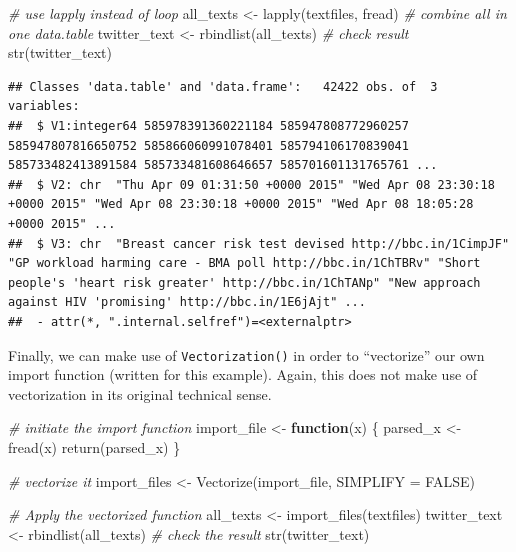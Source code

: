 \documentclass[
  12pt,
]{style/krantz}
\newenvironment{Shaded}{\begin{snugshade}}{\end{snugshade}}
\newcommand{\AttributeTok}[1]{\textcolor[rgb]{0.77,0.63,0.00}{#1}}
\newcommand{\CommentTok}[1]{\textcolor[rgb]{0.56,0.35,0.01}{\textit{#1}}}
\newcommand{\ConstantTok}[1]{\textcolor[rgb]{0.00,0.00,0.00}{#1}}
\newcommand{\ControlFlowTok}[1]{\textcolor[rgb]{0.13,0.29,0.53}{\textbf{#1}}}
\newcommand{\FunctionTok}[1]{\textcolor[rgb]{0.00,0.00,0.00}{#1}}
\newcommand{\NormalTok}[1]{#1}
\newcommand{\OtherTok}[1]{\textcolor[rgb]{0.56,0.35,0.01}{#1}}
\begin{document}
\begin{Shaded}
\begin{Highlighting}[]
\CommentTok{\# use lapply instead of loop}
\NormalTok{all\_texts }\OtherTok{\textless{}{-}} \FunctionTok{lapply}\NormalTok{(textfiles, fread)}
\CommentTok{\# combine all in one data.table}
\NormalTok{twitter\_text }\OtherTok{\textless{}{-}} \FunctionTok{rbindlist}\NormalTok{(all\_texts)}
\CommentTok{\# check result}
\FunctionTok{str}\NormalTok{(twitter\_text)}
\end{Highlighting}
\end{Shaded}

\begin{verbatim}
## Classes 'data.table' and 'data.frame':   42422 obs. of  3 variables:
##  $ V1:integer64 585978391360221184 585947808772960257 585947807816650752 585866060991078401 585794106170839041 585733482413891584 585733481608646657 585701601131765761 ... 
##  $ V2: chr  "Thu Apr 09 01:31:50 +0000 2015" "Wed Apr 08 23:30:18 +0000 2015" "Wed Apr 08 23:30:18 +0000 2015" "Wed Apr 08 18:05:28 +0000 2015" ...
##  $ V3: chr  "Breast cancer risk test devised http://bbc.in/1CimpJF" "GP workload harming care - BMA poll http://bbc.in/1ChTBRv" "Short people's 'heart risk greater' http://bbc.in/1ChTANp" "New approach against HIV 'promising' http://bbc.in/1E6jAjt" ...
##  - attr(*, ".internal.selfref")=<externalptr>
\end{verbatim}

Finally, we can make use of \texttt{Vectorization()} in order to ``vectorize'' our own import function (written for this example). Again, this does not make use of vectorization in its original technical sense.

\begin{Shaded}
\begin{Highlighting}[]
\CommentTok{\# initiate the import function}
\NormalTok{import\_file }\OtherTok{\textless{}{-}} 
     \ControlFlowTok{function}\NormalTok{(x) \{}
\NormalTok{          parsed\_x }\OtherTok{\textless{}{-}} \FunctionTok{fread}\NormalTok{(x)}
          \FunctionTok{return}\NormalTok{(parsed\_x)}
\NormalTok{     \}}

\CommentTok{\# \textquotesingle{}vectorize\textquotesingle{} it}
\NormalTok{import\_files }\OtherTok{\textless{}{-}} \FunctionTok{Vectorize}\NormalTok{(import\_file, }\AttributeTok{SIMPLIFY =} \ConstantTok{FALSE}\NormalTok{)}

\CommentTok{\# Apply the vectorized function}
\NormalTok{all\_texts }\OtherTok{\textless{}{-}} \FunctionTok{import\_files}\NormalTok{(textfiles)}
\NormalTok{twitter\_text }\OtherTok{\textless{}{-}} \FunctionTok{rbindlist}\NormalTok{(all\_texts)}
\CommentTok{\# check the result}
\FunctionTok{str}\NormalTok{(twitter\_text)}
\end{Highlighting}
\end{Shaded}
\end{document}
